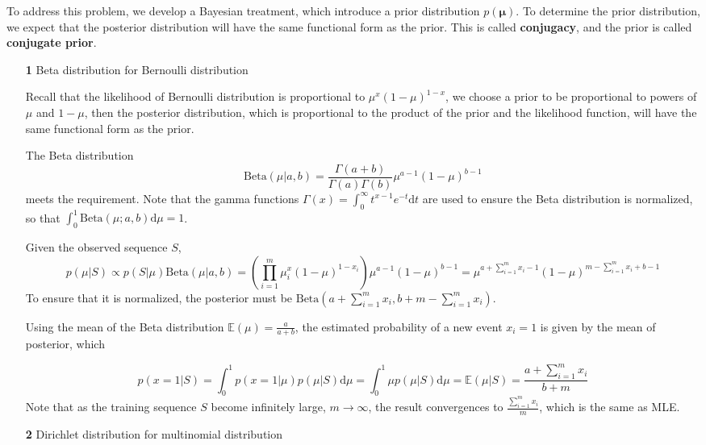 \documentclass{article}
\begin{document}
	To address this problem, we develop a Bayesian treatment, which introduce a prior distribution $p(\bm{\mu})$. To determine the prior distribution, we expect that the posterior distribution will have the same functional form as the prior. This is called \textbf{conjugacy}, and the prior is called \textbf{conjugate prior}.
	
	\begin{itemize}
	\item [\textbf{1}] Beta distribution for Bernoulli distribution
	
	Recall that the likelihood of Bernoulli distribution is proportional to $\mu^x (1-\mu)^{1-x}$,	we choose a prior to be proportional to powers of $\mu$ and $1-\mu$, then the posterior distribution, which is proportional to the product of the prior and the likelihood function, will have the same functional form as the prior.
	
	The Beta distribution 
	\begin{equation}
	\mathrm{Beta}(\mu|a,b)=\frac{\Gamma(a+b)}{\Gamma(a)\Gamma(b)}\mu^{a-1}(1-\mu)^{b-1}
	\end{equation}
meets the requirement. Note that the gamma functions $\Gamma(x)=\int^\infty_0 t^{x-1} e^{-t} \mathrm{d} t$ are used to ensure the Beta distribution is normalized, so that $\int_0^1 \mathrm{Beta}(\mu;a,b)\mathrm{d}\mu = 1$.
	
	Given the observed sequence $S$, 
	\begin{equation*}
	p(\mu|S) \propto p(S|\mu) \mathrm{Beta}(\mu|a,b) = \left( \prod_{i=1}^m \mu^x_i (1-\mu)^{1-x_i} \right) \mu^{a-1}(1-\mu)^{b-1} = \mu^{a+\sum_{i=1}^m x_i-1}(1-\mu)^{m-\sum_{i=1}^m x_i + b-1}
	\end{equation*}
To ensure that it is normalized, the posterior must be $\mathrm{Beta}(a+\sum_{i=1}^m x_i, b+m-\sum_{i=1}^m x_i)$.

	Using the mean of the Beta distribution $\mathbb{E}(\mu)=\frac{a}{a+b}$, the estimated probability of a new event $x_i=1$ is given by the mean of posterior, which
	
	\begin{equation*}
	p(x=1|S)=\int^1_0 p(x=1|\mu)p(\mu|S) \mathrm{d}\mu = \int^1_0 \mu p(\mu|S) \mathrm{d}\mu = \mathbb{E}(\mu|S) = \frac{a+\sum_{i=1}^m x_i}{b+m}
	\end{equation*}
Note that as the training sequence $S$ become infinitely large, $m\rightarrow\infty$, the result convergences to $\frac{\sum_{i=1}^m x_i}{m}$, which is the same as MLE.
	
	\item [\textbf{2}] Dirichlet distribution for multinomial distribution


\end{itemize}
\end{document}
